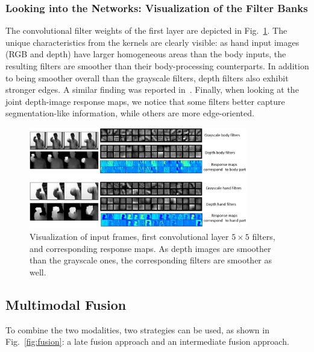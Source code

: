 
\subsubsection{Looking into the Networks: Visualization of the Filter Banks}

The convolutional filter weights of the first layer are depicted in Fig.~\ref{3dcnn_filters}.
The unique characteristics from the kernels are clearly visible: as hand input images (RGB and depth) have larger homogeneous areas
than the body inputs, the resulting filters are smoother than their body-processing counterparts.
In addition to being smoother overall than the grayscale filters, depth filters also exhibit stronger edges. A similar finding was reported in~\cite{socher2012convolutional}.
%
Finally, when looking at the joint depth-image response maps, we  notice that some filters better capture segmentation-like information, while others are more edge-oriented.

\begin{figure}[t]
  \centering
  \includegraphics[width=0.85\textwidth]{images/CNN_filters}
  \caption{
  \small{Visualization of input frames, first convolutional layer $5\times5$ filters, and corresponding response maps.
As depth images are smoother than the grayscale ones, the corresponding filters are smoother as well.}
}\label{3dcnn_filters}
\end{figure}


\subsection{Multimodal Fusion}
To combine the two modalities, two strategies can be used, as shown in Fig.~\ref{fig:fusion}:
a late fusion approach and an intermediate fusion approach.


